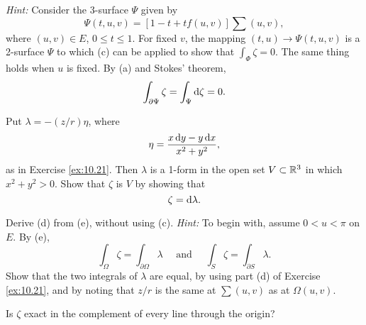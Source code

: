 \begin{myexercise}
\begin{asparaenum}[(a)]
        \emph{Hint:} Consider the 3-surface $\Psi$ given by
        \begin{equation*}
            \Psi(t,u,v) = \left[ 1-t+t f(u,v) \right] \sum (u,v) ,
        \end{equation*}
        where $(u, v) \in E$, $0 \leq t \leq 1$.
        For fixed $v$, the mapping $(t, u) \rightarrow \Psi(t, u, v)$ is a 2-surface $\Psi$ to which (c) can be applied to show that $\int_{\Phi} \zeta = 0$.
        The same thing holds when $u$ is fixed.
        By (a) and Stokes' theorem,
        \begin{equation*}
            \int_{\partial \Psi} \zeta =
            \int_{\Psi} \d \zeta = 0.
        \end{equation*}
        \item Put $\lambda = -(z/r)\eta$, where
        \begin{equation*}
            \eta = \frac{x \d y - y \d x}{x^2+y^2} ,
        \end{equation*}
        as in Exercise \ref{ex:10.21}.
        Then $\lambda$ is a 1-form in the open set $V \subset {\protect\mathbb R}^3$ in which $x^2 + y^2 > 0$.
        Show that $\zeta$ is  $V$ by showing that
        \begin{equation*}
            \zeta = \d \lambda .
        \end{equation*}
        \item Derive (d) from (e), without using (c).
        \emph{Hint:} To begin with, assume $0 < u < \pi$ on $E$.
        By (e),
        \begin{equation*}
            \int_{\Omega} \zeta = \int_{\partial \Omega} \lambda
            \quad \text{ and } \quad
            \int_{S} \zeta = \int_{\partial S} \lambda .
        \end{equation*}
        Show that the two integrals of $\lambda$ are equal, by using part (d) of Exercise \ref{ex:10.21},
        and by noting that $z/r$ is the same at $\sum(u, v)$ as at $\Omega(u, v)$.
        \item Is $\zeta$ exact in the complement of every line through the origin?
    \end{asparaenum}
\end{myexercise}


